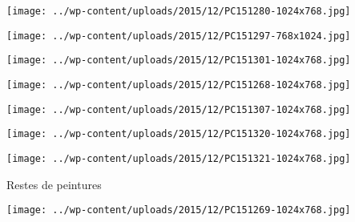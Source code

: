  

 

\begin{center} \texttt{[image: ../wp-content/uploads/2015/12/PC151280-1024x768.jpg]} \end{center}

 

 

\begin{center} \texttt{[image: ../wp-content/uploads/2015/12/PC151297-768x1024.jpg]} \end{center}

 

 

\begin{center} \texttt{[image: ../wp-content/uploads/2015/12/PC151301-1024x768.jpg]} \end{center}

 

 

\begin{center} \texttt{[image: ../wp-content/uploads/2015/12/PC151268-1024x768.jpg]} \end{center}

 

 

\begin{center} \texttt{[image: ../wp-content/uploads/2015/12/PC151307-1024x768.jpg]} \end{center}

 

 

\begin{center} \texttt{[image: ../wp-content/uploads/2015/12/PC151320-1024x768.jpg]} \end{center}

 

 

\begin{center} \texttt{[image: ../wp-content/uploads/2015/12/PC151321-1024x768.jpg]} \end{center}

 

 Restes de peintures 

 

\begin{center} \texttt{[image: ../wp-content/uploads/2015/12/PC151269-1024x768.jpg]} \end{center}

